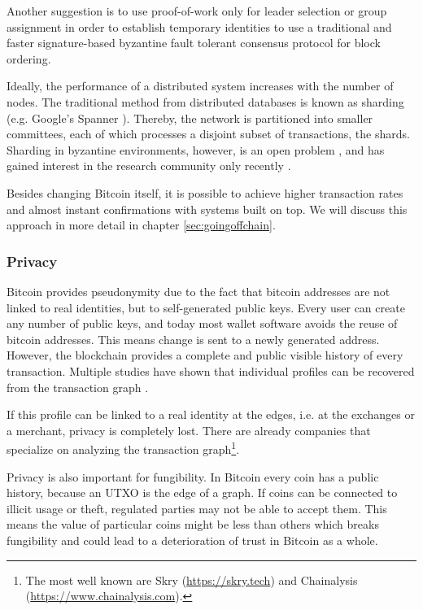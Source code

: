 Another suggestion is to use proof-of-work only for leader selection \parencite{194906} or group assignment \parencite{DBLP:journals/corr/Kokoris-KogiasJ16} in order to establish temporary identities to use a traditional and faster signature-based byzantine fault tolerant consensus protocol for block ordering. 

Ideally, the performance of a distributed system increases with the number of nodes. The traditional method from distributed databases is known as sharding (e.g. Google's Spanner \parencite{Corbett2012Spanner}). Thereby, the network is partitioned into smaller committees, each of which processes a disjoint subset of transactions, the shards. Sharding in byzantine environments, however, is an open problem \parencite{croman2016scaling}, and has gained interest in the research community only recently \parencite{Luu2016Sharding,Gencer2016Aspen}.
 
Besides changing Bitcoin itself, it is possible to achieve higher transaction rates and almost instant confirmations with systems built on top. We will discuss this approach in more detail in chapter \ref{sec:goingoffchain}.
 
\subsubsection{Privacy}
\label{sec:crypto_chall_privacy}

Bitcoin provides pseudonymity due to the fact that bitcoin addresses are not linked to real identities, but to self-generated public keys. Every user can create any number of public keys, and today most wallet software avoids the reuse of bitcoin addresses. This means change is sent to a newly generated address. However, the blockchain provides a complete and public visible history of every transaction. Multiple studies have shown that individual profiles can be recovered from the transaction graph \parencite{Ron2013,Androulaki2013,Reid2013,Babaioff:2012:BRB:2229012.2229022,fi5020237,Spagnuolo2014}.

If this profile can be linked to a real identity at the edges, i.e. at the exchanges or a merchant, privacy is completely lost. There are already companies that specialize on analyzing the transaction graph\footnote{The most well known are Skry (\url{https://skry.tech}) and Chainalysis (\url{https://www.chainalysis.com}).}.

Privacy is also important for fungibility. In Bitcoin every coin has a public history, because an \ac{UTXO} is the edge of a graph. If coins can be connected to illicit usage or theft, regulated parties may not be able to accept them. This means the value of particular coins might be less than others which breaks fungibility and could lead to a deterioration of trust in Bitcoin as a whole.

